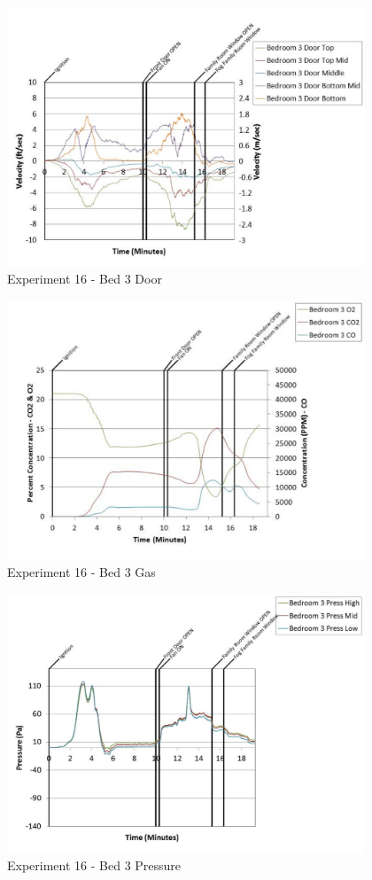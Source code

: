 \documentclass{article}
\begin{document}
\begin{appendices}
	\begin{figure}[h!]
		\centering
		\includegraphics[height=3.05in]{0_Images/Results_Charts/Exp_16_Charts/Bed3Door.pdf}
		\caption{Experiment 16 - Bed 3 Door}
	\end{figure}
 
	\clearpage

	\begin{figure}[h!]
		\centering
		\includegraphics[height=3.05in]{0_Images/Results_Charts/Exp_16_Charts/Bed3Gas.pdf}
		\caption{Experiment 16 - Bed 3 Gas}
	\end{figure}
 

	\begin{figure}[h!]
		\centering
		\includegraphics[height=3.05in]{0_Images/Results_Charts/Exp_16_Charts/Bed3Pressure.pdf}
		\caption{Experiment 16 - Bed 3 Pressure}
	\end{figure}
 

\end{appendices}
\end{document}
